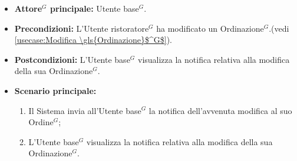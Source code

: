 \label{usecase:Visualizzazione notifica modifica \gls{Ordinazione}$^G$}
\begin{itemize}
	\item \textbf{\gls{Attore}$^G$ principale:} \gls{Utente base}$^G$.

	\item \textbf{Precondizioni:} L'\gls{Utente ristoratore}$^G$ ha modificato un \gls{Ordinazione}$^G$.(vedi \autoref{usecase:Modifica \gls{Ordinazione}$^G$}).

	\item \textbf{Postcondizioni:} L'\gls{Utente base}$^G$ visualizza la notifica relativa alla modifica della sua \gls{Ordinazione}$^G$.

	\item \textbf{Scenario principale:}
	      \begin{enumerate}
		      \item Il Sistema invia all'\gls{Utente base}$^G$ la notifica dell'avvenuta modifica al suo \gls{Ordine}$^G$;

		      \item L'\gls{Utente base}$^G$ visualizza la notifica relativa alla modifica della sua \gls{Ordinazione}$^G$.
	      \end{enumerate}
\end{itemize}
